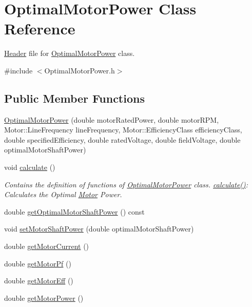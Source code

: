 \hypertarget{class_optimal_motor_power}{}\section{Optimal\+Motor\+Power Class Reference}
\label{class_optimal_motor_power}


\hyperlink{class_header}{Header} file for \hyperlink{class_optimal_motor_power}{Optimal\+Motor\+Power} class.  




{\ttfamily \#include $<$Optimal\+Motor\+Power.\+h$>$}

\subsection*{Public Member Functions}
\begin{DoxyCompactItemize}
\item 
\hyperlink{class_optimal_motor_power_a36017bbd359437ce77c1e18dc2377961}{Optimal\+Motor\+Power} (double motor\+Rated\+Power, double motor\+R\+PM, Motor\+::\+Line\+Frequency line\+Frequency, Motor\+::\+Efficiency\+Class efficiency\+Class, double specified\+Efficiency, double rated\+Voltage, double field\+Voltage, double optimal\+Motor\+Shaft\+Power)
\item 
void \hyperlink{class_optimal_motor_power_ad4c02e2828d497a0b7f1c9198707f770}{calculate} ()
\begin{DoxyCompactList}\small\item\em Contains the definition of functions of \hyperlink{class_optimal_motor_power}{Optimal\+Motor\+Power} class. \hyperlink{class_optimal_motor_power_ad4c02e2828d497a0b7f1c9198707f770}{calculate()}\+: Calculates the Optimal \hyperlink{class_motor}{Motor} Power. \end{DoxyCompactList}\item 
double \hyperlink{class_optimal_motor_power_a7d6e976abf406c54637d3b51e098d7c8}{get\+Optimal\+Motor\+Shaft\+Power} () const
\item 
void \hyperlink{class_optimal_motor_power_ada8a9e3caac34c54470ad13ffe7edf53}{set\+Motor\+Shaft\+Power} (double optimal\+Motor\+Shaft\+Power)
\item 
double \hyperlink{class_optimal_motor_power_a2c058c4320a840018a420e10272cc4dd}{get\+Motor\+Current} ()
\item 
double \hyperlink{class_optimal_motor_power_a94d4c8a84c1bd19b799e35b966368f5a}{get\+Motor\+Pf} ()
\item 
double \hyperlink{class_optimal_motor_power_a341fe7520227f27f9cce23f3dc4cb0cb}{get\+Motor\+Eff} ()
\item 
double \hyperlink{class_optimal_motor_power_af35a32c24df9198bcf0df5b8f6ea03a9}{get\+Motor\+Power} ()
\end{DoxyCompactItemize}


